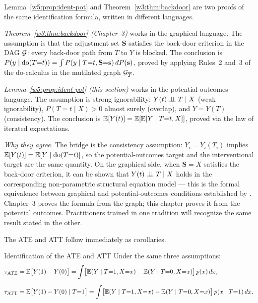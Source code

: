 \documentclass[master.tex]{subfiles}
\begin{document}
\begin{remark}
\label{w5:rem:two-languages}
Lemma~\ref{w5:prop:ident-pot} and Theorem~\ref{w3:thm:backdoor}
are two proofs of the same identification formula, written in different
languages.

\smallskip
\noindent\textit{Theorem~\ref{w3:thm:backdoor} (Chapter~3)} works in
the graphical language.  The assumption is that the adjustment set
$\mathbf{S}$ satisfies the back-door criterion in the DAG $\mathcal{G}$:
every back-door path from $T$ to $Y$ is blocked.  The conclusion is
$P(y \mid \mathrm{do}(T{=}t)) = \int P(y \mid T{=}t, \mathbf{S}{=}\mathbf{s})
\, dP(\mathbf{s})$, proved by applying Rules~2 and~3 of the
do-calculus in the mutilated graph $\mathcal{G}_{\overline{T}}$.

\smallskip
\noindent\textit{Lemma~\ref{w5:prop:ident-pot} (this section)}
works in the potential-outcomes language.  The assumption is strong
ignorability: $Y(t) \perp\!\!\!\perp T \mid X$ (weak ignorability), $P(T{=}t
\mid X) > 0$ almost surely (overlap), and $Y = Y(T)$ (consistency).
The conclusion is $\mathbb{E}[Y(t)] = \mathbb{E}[\mathbb{E}[Y \mid T{=}t, X]]$, proved via the
law of iterated expectations.

\smallskip
\noindent\textit{Why they agree.}  The bridge is the consistency
assumption: $Y_i = Y_i(T_i)$ implies $\mathbb{E}[Y(t)] = \mathbb{E}[Y \mid
\mathrm{do}(T{=}t)]$, so the potential-outcomes target and the
interventional target are the same quantity.  On the graphical side,
when $\mathbf{S} = X$ satisfies the back-door criterion, it can be
shown that $Y(t) \perp\!\!\!\perp T \mid X$ holds in the corresponding
non-parametric structural equation model --- this is the formal
equivalence between graphical and potential-outcomes conditions
established by \citet{pearl2009causality}.  Chapter~3 proves the formula
from the graph; this chapter proves it from the potential outcomes.
Practitioners trained in one tradition will recognize the same result
stated in the other.
\end{remark}

\noindent The ATE and ATT follow immediately as corollaries.

\begin{thm}{Identification of the ATE and ATT}
\label{w5:prop:ident-ate}
Under the same three assumptions:
\begin{align}
  \tau_{\mathrm{ATE}}
  &= \mathbb{E}\bigl[Y(1) - Y(0)\bigr]
  = \int \bigl[\mathbb{E}(Y \mid T{=}1, X{=}x)
             - \mathbb{E}(Y \mid T{=}0, X{=}x)\bigr]\, p(x)\, dx,
  \label{w5:eq:backdoor} \\[6pt]
  \tau_{\mathrm{ATT}}
  &= \mathbb{E}\bigl[Y(1) - Y(0) \mid T{=}1\bigr]
  = \int \bigl[\mathbb{E}(Y \mid T{=}1, X{=}x)
             - \mathbb{E}(Y \mid T{=}0, X{=}x)\bigr]\, p(x \mid T{=}1)\, dx.
  \label{w5:eq:backdoor-att}
\end{align}
\end{thm}
\end{document}
